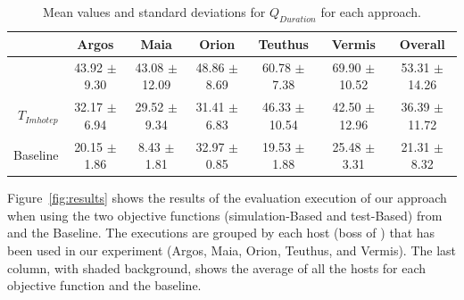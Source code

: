 \begin{table}[ht!]
\centering
\caption{Mean values and standard deviations for $Q_{Duration}$ for each approach.}
\label{tab:results}
\begin{tabular}{@{}ccccccc@{}}
\toprule
    & Argos            & Maia              & Orion            & Teuthus           & Vermis            & Overall           \\ \midrule
                                   \rowcolor[HTML]{C0C0C0}
\multicolumn{1}{r}{\cellcolor[HTML]{FFFFFF}{$S_{Imhotep}$}} & 43.92 $\pm$ 9.30 & 43.08 $\pm$ 12.09 & 48.86 $\pm$ 8.69 & 60.78 $\pm$ 7.38  & 69.90 $\pm$ 10.52 & 53.31 $\pm$ 14.26 \\ \midrule
\multicolumn{1}{r}{$T_{Imhotep}$} & 32.17 $\pm$ 6.94 & 29.52 $\pm$ 9.34  & 31.41 $\pm$ 6.83 & 46.33 $\pm$ 10.54 & 42.50 $\pm$ 12.96 & 36.39 $\pm$ 11.72 \\ \midrule
\multicolumn{1}{r}{Baseline} & 20.15 $\pm$ 1.86 & 8.43 $\pm$ 1.81   & 32.97 $\pm$ 0.85 & 19.53 $\pm$ 1.88  & 25.48 $\pm$ 3.31  & 21.31 $\pm$ 8.32  \\ \bottomrule
\end{tabular}
\end{table}

Figure~\ref{fig:results} shows the results of the evaluation execution of our approach when using the two objective functions (simulation-Based and test-Based) from \ApproachName{} and the Baseline. The executions are grouped by each host (boss of \CaseStudy{}) that has been used in our experiment (Argos, Maia, Orion, Teuthus, and Vermis). The last column, with shaded background, shows the average of all the hosts for each objective function and the baseline. 

